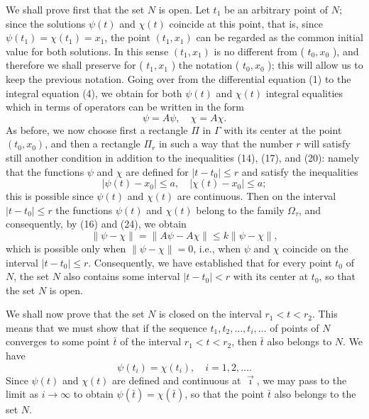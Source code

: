 \documentclass[10pt,a5paper]{book}
\makeatletter
\theoremstyle{plain}
\theoremstyle{definition}
\theoremstyle{remark}
\renewenvironment{proof}[1][\proofname]{\par
  \pushQED{\qed}%
  \normalfont\topsep6\p@\@plus6\p@\relax
  \trivlist
  \item\relax{\itshape #1\@addpunct{.}}\hspace\labelsep\ignorespaces
}{\popQED\endtrivlist\@endpefalse}
\makeatother
\begin{document}
\begin{proof}[Proof of Theorem 1]
We shall prove first that the set $N$ is open. Let $t_{1}$ be an arbitrary point of $N$; since the solutions $\psi(t)$ and $\chi(t)$ coincide at this point, that is, since $\psi\left(t_{1}\right)=\chi\left(t_{1}\right)=x_{1}$, the point $\left(t_{1}, x_{1}\right)$ can be regarded as the common initial value for both solutions. In this sense $\left(t_{1}, x_{1}\right)$ is no different from ( $t_{0}, x_{0}$ ), and therefore we shall preserve for ( $t_{1}, x_{1}$ ) the notation ( $t_{0}, x_{0}$ ); this will allow us to keep the previous notation. Going over from the differential equation (1) to the integral equation (4), we obtain for both $\psi(t)$ and $\chi(t)$ integral equalities which in terms of operators can be written in the form
\begin{equation*}
\psi=A \psi, \quad \chi=A \chi . \tag{24}
\end{equation*}
As before, we now choose first a rectangle $\Pi$ in $\Gamma$ with its center at the point $\left(t_{0}, x_{0}\right)$, and then a rectangle $\Pi_{r}$ in such a way that the number $r$ will satisfy still another condition in addition to the inequalities (14), (17), and (20): namely that the functions $\psi$ and $\chi$ are defined for $\left|t-t_{0}\right| \leq r$ and satisfy the inequalities
\[
\left|\psi(t)-x_{0}\right| \leq a, \quad\left|\chi(t)-x_{0}\right| \leq a ;
\]
this is possible since $\psi(t)$ and $\chi(t)$ are continuous. Then on the interval $\left|t-t_{0}\right| \leq r$ the functions $\psi(t)$ and $\chi(t)$ belong to the family $\Omega_{\tau}$, and
consequently, by (16) and (24), we obtain
\[
\|\psi-\chi\|=\|A \psi-A \chi\| \leq k\|\psi-\chi\|,
\]
which is possible only when $\|\psi-\chi\|=0$, i.e., when $\psi$ and $\chi$ coincide on the interval $\left|t-t_{0}\right| \leq r$. Consequently, we have established that for every point $t_{0}$ of $N$, the set $N$ also contains some interval $\left|t-t_{0}\right|<r$ with its center at $t_{0}$, so that the set $N$ is open.

We shall now prove that the set $N$ is closed on the interval $r_{1}<t<r_{2}$. This means that we must show that if the sequence $t_{1}, t_{2}, \ldots, t_{i}, \ldots$ of points of $N$ converges to some point $\bar{t}$ of the interval $r_{1}<t<r_{2}$, then $\bar{t}$ also belongs to $N$. We have
\[
\psi\left(t_{i}\right)=\chi\left(t_{i}\right), \quad i=1,2, \ldots .
\]
Since $\psi(t)$ and $\chi(t)$ are defined and continuous at $\vec{\imath}$, we may pass to the limit as $i \rightarrow \infty$ to obtain $\psi(\bar{t})=\chi(\bar{t})$, so that the point $\bar{t}$ also belongs to the set $N$.


\end{proof}
\end{document}
